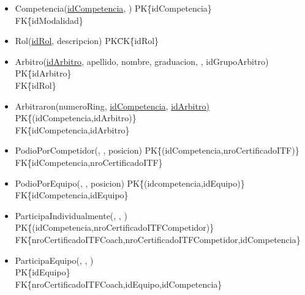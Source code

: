 \begin{itemize}
\item{Competencia(\underline{idCompetencia}, )
PK\=\{idCompetencia\}\\
FK\=\{idModalidad\}
}

\item{Rol(\underline{idRol}, descripcion)
PK\=CK\=\{idRol\}
}

\item{Arbitro(\underline{idArbitro}, apellido, nombre, graduacion, , idGrupoArbitro)\\
PK\=\{idArbitro\}\\
FK\=\{idRol\}
}

\item{Arbitraron(numeroRing, \underline{idCompetencia}, \underline{idArbitro)}
PK\= \{(idCompetencia,idArbitro)\}\\
FK\=\{idCompetencia,idArbitro\}
}

\item{PodioPorCompetidor(\underline{}, \underline{}, posicion)
PK\= \{(idCompetencia,nroCertificadoITF)\}\\
FK\=\{idCompetencia,nroCertificadoITF\}
}

\item{PodioPorEquipo(\underline{}, \underline{}, posicion)
PK\= \{(idcompetencia,idEquipo)\}\\
FK\=\{idCompetencia,idEquipo\}
}

\item{ParticipaIndividualmente(\underline{}, \underline{}, )\\
PK\= \{(idCompetencia,nroCertificadoITFCompetidor)\}\\
FK\=\{nroCertificadoITFCoach,nroCertificadoITFCompetidor,idCompetencia\}
}

\item{ParticipaEquipo(, , \underline{})\\
PK\= \{idEquipo\}\\
FK\=\{nroCertificadoITFCoach,idEquipo,idCompetencia\}
}

\end{itemize}

